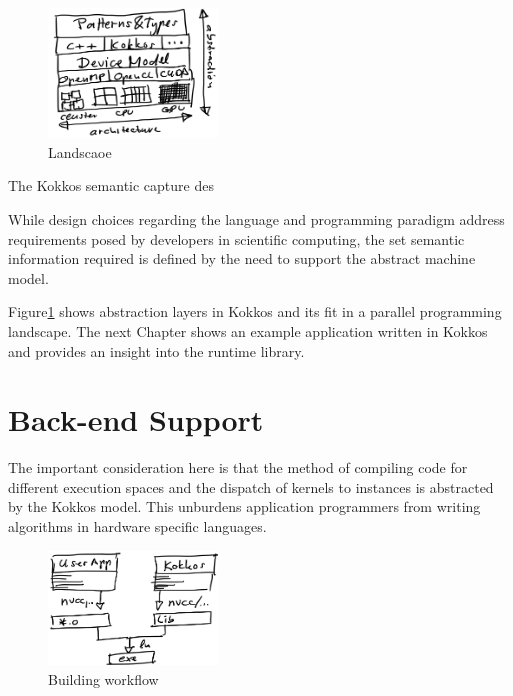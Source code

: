 


\begin{figure}
\centerline{\includegraphics[width=0.4\textwidth]{img/Stack.png}}
\caption{Landscaoe}
\label{fig:stack}
\end{figure}


The Kokkos semantic capture des


 While design choices regarding the language and programming paradigm address requirements posed by developers in scientific computing, the set semantic information required is defined by the need to support the abstract machine model. 

Figure\ref{fig:stack} shows abstraction layers in Kokkos and its fit in a parallel programming landscape.
The next Chapter shows an example application written in Kokkos and provides an insight into the runtime library.


\section{Back-end Support}\label{chap:kokkosBackend}


The important consideration here is that the method of compiling code for different execution spaces and the dispatch of kernels to instances is abstracted by the Kokkos model. This unburdens application programmers from writing algorithms in hardware specific languages.


\begin{figure}
\centerline{\includegraphics[width=0.4\textwidth]{img/Build.png}}
\caption{Building workflow}
\label{fig}
\end{figure}

